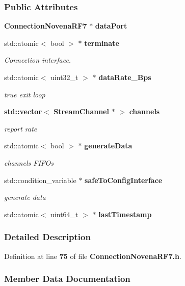 \subsubsection*{Public Attributes}
\begin{DoxyCompactItemize}
\item 
{\bf Connection\+Novena\+R\+F7} $\ast$ {\bf data\+Port}
\item 
std\+::atomic$<$ bool $>$ $\ast$ {\bf terminate}
\begin{DoxyCompactList}\small\item\em Connection interface. \end{DoxyCompactList}\item 
std\+::atomic$<$ uint32\+\_\+t $>$ $\ast$ {\bf data\+Rate\+\_\+\+Bps}
\begin{DoxyCompactList}\small\item\em true exit loop \end{DoxyCompactList}\item 
{\bf std\+::vector}$<$ {\bf Stream\+Channel} $\ast$ $>$ {\bf channels}
\begin{DoxyCompactList}\small\item\em report rate \end{DoxyCompactList}\item 
std\+::atomic$<$ bool $>$ $\ast$ {\bf generate\+Data}
\begin{DoxyCompactList}\small\item\em channels F\+I\+F\+Os \end{DoxyCompactList}\item 
std\+::condition\+\_\+variable $\ast$ {\bf safe\+To\+Config\+Interface}
\begin{DoxyCompactList}\small\item\em generate data \end{DoxyCompactList}\item 
std\+::atomic$<$ uint64\+\_\+t $>$ $\ast$ {\bf last\+Timestamp}
\end{DoxyCompactItemize}


\subsubsection{Detailed Description}


Definition at line {\bf 75} of file {\bf Connection\+Novena\+R\+F7.\+h}.



\subsubsection{Member Data Documentation}
